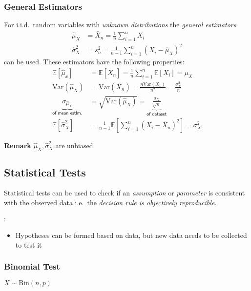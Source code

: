 \subsubsection{General Estimators}
For i.i.d.\ random variables with \textit{unknown distributions} the \textit{general estimators}
\noindent\begin{align*}
    \hat{\mu}_{X}    & =\bar{X}_{n}=\frac1n\sum_{i=1}^{n}X_{i}             \\
    \hat{\sigma}_X^2 & =s_n^2=\frac1{n-1}\sum_{i=1}^n{(X_i-\hat{\mu}_X)}^2
\end{align*}
can be used. These estimators have the following properties:
\noindent\begin{align*}
    \mathbb{E}[\hat{\mu}_x]                                       & =\mathbb{E}[\bar{X}_n]=\frac1n\sum_{i=1}^n\mathbb{E}[X_i]=\mu_X                                    \\
    \mathrm{Var}(\hat{\mu}_X)                                     & =\mathrm{Var}(\bar{X}_n)=\frac{n\mathrm{Var}(X_1)}{n^2}=\frac{\sigma_X^2}n                         \\
    \underbrace{\sigma_{\hat{\mu}_{X}}}_{\textsf{of mean estim.}} & =\sqrt{\mathrm{Var}(\hat{\mu}_{X})}=\underbrace{\frac{\sigma_{X}}{\sqrt{n}}}_{\textsf{of dataset}} \\
    \mathbb{E}[\hat{\sigma}_X^2]                                  & =\frac1{n-1}\mathbb{E}\left[\sum_{i=1}^n\left(X_i-\bar{X}_n\right)^2\right] = \sigma^2_X
\end{align*}

\textbf{Remark} $\hat{\mu}_X, \hat{\sigma}_X^2$ are unbiased

\subsection{Statistical Tests}
Statistical tests can be used to check if an \textit{assumption} or \textit{parameter} is consistent with the observed data i.e.\ the \textit{decision rule is objectively reproducible}.

:
\begin{itemize}
    \item Hypotheses can be formed based on data, but new data needs to be collected to test it
\end{itemize}

\subsubsection{Binomial Test}
$X\sim \mathrm{Bin}(n,p)$

